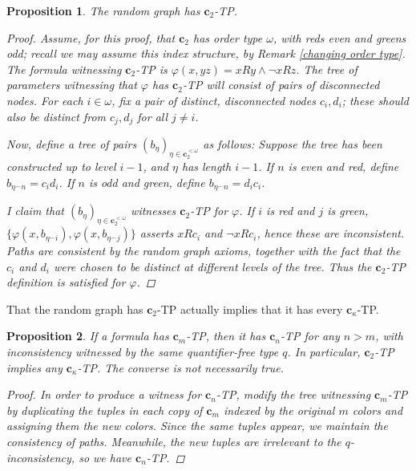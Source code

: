 \documentclass{article}
\newcommand{\vphi}{\varphi}
\newtheorem{proposition}{Proposition}
\theoremstyle{definition}
\theoremstyle{definition}
\theoremstyle{definition}
\theoremstyle{definition}
\begin{document}
\begin{proposition}{}\label{random graph C-TP}
The random graph has $\textbf{c}_2$-TP.
\begin{proof}

Assume, for this proof, that $\textbf{c}_2$ has order type $\omega$, with reds even and greens odd; recall we may assume this index structure, by Remark \ref{changing order type}. The formula witnessing $\textbf{c}_2$-TP is $\vphi(x,yz)=xRy\land\neg xRz$. The tree of parameters witnessing that $\vphi$ has $\textbf{c}_2$-TP will consist of pairs of disconnected nodes. For each $i\in\omega$, fix a pair of distinct, disconnected nodes $c_i, d_i$; these should also be distinct from $c_j,d_j$ for all $j\neq i$. 

Now, define a tree of pairs $(b_\eta)_{\eta\in \textbf{c}_2^{<\omega}}$ as follows: Suppose the tree has been constructed up to level $i-1$, and $\eta$ has length $i-1$. If $n$ is even and red, define $b_{\eta^\smallfrown n}=c_id_i$. If $n$ is odd and green, define $b_{\eta^\smallfrown n}=d_ic_i$.

I claim that $(b_\eta)_{\eta\in \textbf{c}_2^{<\omega}}$ witnesses $\textbf{c}_2$-TP for $\vphi$. If $i$ is red and $j$ is green, $\{\vphi(x,b_{\eta^\smallfrown i}),\vphi(x,b_{\eta^\smallfrown j})\}$ asserts $xRc_i$ and $\neg xRc_i$, hence these are inconsistent. Paths are consistent by the random graph axioms, together with the fact that the $c_i$ and $d_i$ were chosen to be distinct at different levels of the tree. Thus the $\textbf{c}_2$-TP definition is satisfied for $\vphi$.

\end{proof}
\end{proposition}

That the random graph has $\textbf{c}_2$-TP actually implies that it has every $\textbf{c}_\kappa$-TP. 

\begin{proposition}{}\label{changing the number of colors}
If a formula has $\textbf{c}_m$-TP, then it has $\textbf{c}_n$-TP for any $n>m$, with inconsistency witnessed by the same quantifier-free type $q$. In particular, $\textbf{c}_2$-TP implies any $\textbf{c}_\kappa$-TP. The converse is not necessarily true.

\begin{proof}
    In order to produce a witness for $\textbf{c}_n$-TP, modify the tree witnessing $\textbf{c}_m$-TP by duplicating the tuples in each copy of $\textbf{c}_m$ indexed by the original $m$ colors and assigning them the new colors. Since the same tuples appear, we maintain the consistency of paths. Meanwhile, the new tuples are irrelevant to the $q$-inconsistency, so we have $\textbf{c}_n$-TP.
\end{proof}
\end{proposition}
\end{document}
